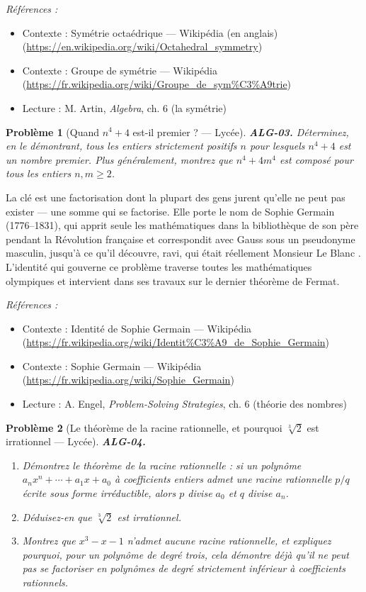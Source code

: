 \documentclass[11pt]{article}
\newtheorem{problem}{Problème}
\newenvironment{refs}{\par\small\noindent\emph{Références :}\begin{itemize}\setlength\itemsep{0pt}}{\end{itemize}\normalsize}
\begin{document}
\begin{refs}
\item Contexte : Symétrie octaédrique --- Wikipédia (en anglais) (\url{https://en.wikipedia.org/wiki/Octahedral_symmetry})
\item Contexte : Groupe de symétrie --- Wikipédia (\url{https://fr.wikipedia.org/wiki/Groupe_de_sym%C3%A9trie})
\item Lecture : M. Artin, \textit{Algebra}, ch. 6 (la symétrie)
\end{refs}

\bigskip

\begin{problem}[{Quand $n^4 + 4$ est-il premier ? --- Lycée}]
\textbf{ALG-03.} Déterminez, en le démontrant, tous les entiers strictement positifs $n$ pour lesquels
$n^4 + 4$ est un nombre premier. Plus généralement, montrez que $n^4 + 4m^4$ est composé pour tous les
entiers $n, m \ge 2$.
\end{problem}

\noindent La clé est une factorisation dont la plupart des gens jurent qu'elle ne peut pas exister --- une somme
qui se factorise. Elle porte le nom de Sophie Germain (1776--1831), qui apprit seule les mathématiques
dans la bibliothèque de son père pendant la Révolution française et correspondit avec Gauss sous un
pseudonyme masculin, jusqu'à ce qu'il découvre, ravi, qui était réellement \og{} Monsieur Le Blanc \fg{}. L'identité
qui gouverne ce problème traverse toutes les mathématiques olympiques et intervient dans ses travaux sur le
dernier théorème de Fermat.

\begin{refs}
\item Contexte : Identité de Sophie Germain --- Wikipédia (\url{https://fr.wikipedia.org/wiki/Identit%C3%A9_de_Sophie_Germain})
\item Contexte : Sophie Germain --- Wikipédia (\url{https://fr.wikipedia.org/wiki/Sophie_Germain})
\item Lecture : A. Engel, \textit{Problem-Solving Strategies}, ch. 6 (théorie des nombres)
\end{refs}

\bigskip

\begin{problem}[{Le théorème de la racine rationnelle, et pourquoi $\sqrt[3]{2}$ est irrationnel --- Lycée}]
\textbf{ALG-04.} \begin{enumerate}
\item[(i)] Démontrez le théorème de la racine rationnelle : si un polynôme
$a_n x^n + \cdots + a_1 x + a_0$ à coefficients entiers admet une racine rationnelle $p/q$ écrite sous
forme irréductible, alors $p$ divise $a_0$ et $q$ divise $a_n$.
\item[(ii)] Déduisez-en que
$\sqrt[3]{2}$ est irrationnel.
\item[(iii)] Montrez que $x^3 - x - 1$ n'admet aucune racine rationnelle, et
expliquez pourquoi, pour un polynôme de degré trois, cela démontre déjà qu'il ne peut pas se factoriser en
polynômes de degré strictement inférieur à coefficients rationnels.
\end{enumerate}

\end{problem}
\end{document}
